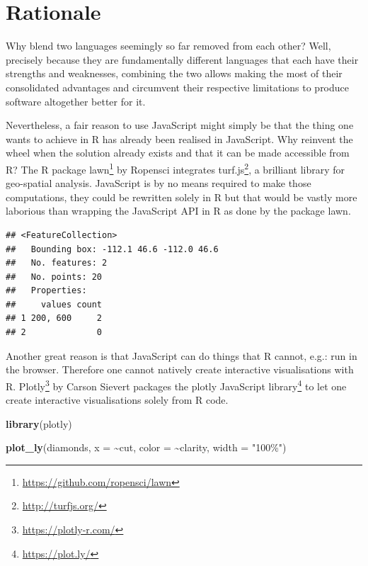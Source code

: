 \documentclass[
]{krantz}
\makeatletter
\newenvironment{Shaded}{\begin{snugshade}}{\end{snugshade}}
\newcommand{\DataTypeTok}[1]{\textcolor[rgb]{0.27,0.27,0.27}{#1}}
\newcommand{\KeywordTok}[1]{\textcolor[rgb]{0.27,0.27,0.27}{\textbf{#1}}}
\newcommand{\NormalTok}[1]{#1}
\newcommand{\OperatorTok}[1]{\textcolor[rgb]{0.43,0.43,0.43}{\textbf{#1}}}
\newcommand{\StringTok}[1]{\textcolor[rgb]{0.5,0.5,0.5}{#1}}
\renewcommand{\href}[2]{#2\footnote{\url{#1}}}
\newenvironment{kframe}{%
\medskip{}
\setlength{\fboxsep}{.8em}
 \def\at@end@of@kframe{}%
 \ifinner\ifhmode%
  \def\at@end@of@kframe{\end{minipage}}%
  \begin{minipage}{\columnwidth}%
 \fi\fi%
 \def\FrameCommand##1{\hskip\@totalleftmargin \hskip-\fboxsep
 \colorbox{shadecolor}{##1}\hskip-\fboxsep
     \hskip-\linewidth \hskip-\@totalleftmargin \hskip\columnwidth}%
 \MakeFramed {\advance\hsize-\width
   \@totalleftmargin\z@ \linewidth\hsize
   \@setminipage}}%
 {\par\unskip\endMakeFramed%
 \at@end@of@kframe}
\renewenvironment{Shaded}{\begin{kframe}}{\end{kframe}}
\makeatother
\begin{document}
\hypertarget{rationale}{%
\section{Rationale}\label{rationale}}

Why blend two languages seemingly so far removed from each other? Well, precisely because they are fundamentally different languages that each have their strengths and weaknesses, combining the two allows making the most of their consolidated advantages and circumvent their respective limitations to produce software altogether better for it.

Nevertheless, a fair reason to use JavaScript might simply be that the thing one wants to achieve in R has already been realised in JavaScript. Why reinvent the wheel when the solution already exists and that it can be made accessible from R? The R package \href{https://github.com/ropensci/lawn}{lawn} \citep{R-lawn} by Ropensci integrates \href{http://turfjs.org/}{turf.js}, a brilliant library for geo-spatial analysis. JavaScript is by no means required to make those computations, they could be rewritten solely in R but that would be vastly more laborious than wrapping the JavaScript API in R as done by the package lawn.

\begin{Shaded}
\end{Shaded}

\begin{verbatim}
## <FeatureCollection>
##   Bounding box: -112.1 46.6 -112.0 46.6
##   No. features: 2
##   No. points: 20
##   Properties: 
##     values count
## 1 200, 600     2
## 2              0
\end{verbatim}

Another great reason is that JavaScript can do things that R cannot, e.g.: run in the browser. Therefore one cannot natively create interactive visualisations with R. \href{https://plotly-r.com/}{Plotly} \citep{R-plotly} by Carson Sievert packages the \href{https://plot.ly/}{plotly JavaScript library} to let one create interactive visualisations solely from R code.

\begin{Shaded}
\begin{Highlighting}[]
\KeywordTok{library}\NormalTok{(plotly)}

\KeywordTok{plot\_ly}\NormalTok{(diamonds, }\DataTypeTok{x =} \OperatorTok{\textasciitilde{}}\NormalTok{cut, }\DataTypeTok{color =} \OperatorTok{\textasciitilde{}}\NormalTok{clarity, }\DataTypeTok{width =} \StringTok{"100\%"}\NormalTok{)}
\end{Highlighting}
\end{Shaded}
\end{document}
